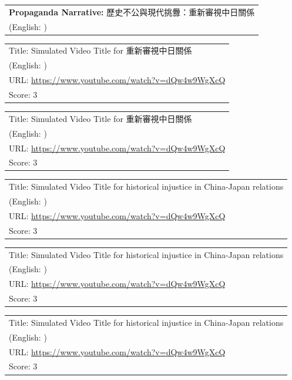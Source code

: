 \documentclass{article}
\begin{document}
\vspace{1em}
\noindent
\begin{tabular}{p{}}
\textbf{Propaganda Narrative:} 歷史不公與現代挑釁：重新審視中日關係 \\
(English: ) \\
\end{tabular}

\noindent
\begin{tabular}{p{}}
Title: Simulated Video Title for 重新審視中日關係 \\
(English: ) \\
URL: \url{https://www.youtube.com/watch?v=dQw4w9WgXcQ} \\
Score: 3 \\
\end{tabular}
\vspace{0.5em}

\noindent
\begin{tabular}{p{}}
Title: Simulated Video Title for 重新審視中日關係 \\
(English: ) \\
URL: \url{https://www.youtube.com/watch?v=dQw4w9WgXcQ} \\
Score: 3 \\
\end{tabular}
\vspace{0.5em}

\noindent
\begin{tabular}{p{}}
Title: Simulated Video Title for historical injustice in China-Japan relations \\
(English: ) \\
URL: \url{https://www.youtube.com/watch?v=dQw4w9WgXcQ} \\
Score: 3 \\
\end{tabular}
\vspace{0.5em}

\noindent
\begin{tabular}{p{}}
Title: Simulated Video Title for historical injustice in China-Japan relations \\
(English: ) \\
URL: \url{https://www.youtube.com/watch?v=dQw4w9WgXcQ} \\
Score: 3 \\
\end{tabular}
\vspace{0.5em}

\noindent
\begin{tabular}{p{}}
Title: Simulated Video Title for historical injustice in China-Japan relations \\
(English: ) \\
URL: \url{https://www.youtube.com/watch?v=dQw4w9WgXcQ} \\
Score: 3 \\
\end{tabular}
\vspace{0.5em}
\end{document}
